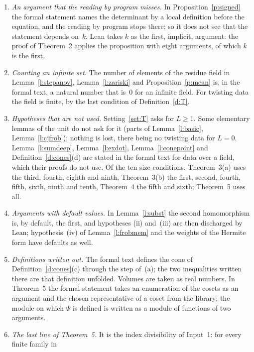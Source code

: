 \documentclass[11pt,a4paper]{article}
\newcommand{\m}[1]{\mbox{$#1$}}        %
\theoremstyle{plainx}
\theoremstyle{uprightx}
\begin{document}
\begin{enumerate}[label=\textup{\arabic*.},leftmargin=1.6em,itemsep=5pt]
the index of the cone of Definition~\ref{d:cones}(d), listed twice. This note states every declaration with the
arguments that its uses in the artifact show: the depth has five, the conditions on forms five and six, the
Frobenius operator five. Lean was not asked.
\item \emph{An argument that the reading by program misses.} In Proposition~\ref{p:signed} the formal statement
names the determinant by a local definition before the equation, and the reading by program stops there; so it
does not see that the statement depends on~$k$. Lean takes $k$ as the first, implicit, argument: the proof of
Theorem~2 applies the proposition with eight arguments, of which $k$ is the first.
\item \emph{Counting an infinite set.} The number of elements of the residue field in
Lemma~\ref{l:stepanov}, Lemma~\ref{l:zariski} and Proposition~\ref{p:mean} is, in the formal text, a natural
number that is~$0$ for an infinite field. For twisting data the field is finite, by the last condition of
Definition~\ref{d:T}.
\item \emph{Hypotheses that are not used.} Setting~\ref{set:T} asks for \m{L\ge1}. Some elementary lemmas of the
unit do not ask for it (parts of Lemma~\ref{l:basic}, Lemma~\ref{l:cjfrob}); nothing is lost, there being no
twisting data for \m{L=0}. Lemma~\ref{l:sumdeep}, Lemma~\ref{l:exdot}, Lemma~\ref{l:conepoint} and
Definition~\ref{d:cones}(d) are stated in the formal text for data over a field, which their proofs do not use.
Of the ten size conditions, Theorem~3(a) uses the third, fourth, eighth and ninth, Theorem~3(b) the first,
second, fourth, fifth, sixth, ninth and tenth, Theorem~4 the fifth and sixth; Theorem~5 uses all.
\item \emph{Arguments with default values.} In Lemma~\ref{l:subst} the second homomorphism is, by default, the
first, and hypotheses (ii) and~(iii) are then discharged by Lean; hypothesis~(iv) of Lemma~\ref{l:frobmem} and the
weights of the Hermite form have defaults as well.
\item \emph{Definitions written out.} The formal text defines the cone of Definition~\ref{d:cones}(c) through
the step of~(a); the two inequalities written there are that definition unfolded. Volumes are taken as real
numbers. In Theorem~5 the formal statement takes an enumeration of the cosets as an argument and the chosen
representative of a coset from the library; the module on which \m{\Psi} is defined is written as a module of
functions of two arguments.
\item \emph{The last line of Theorem~5.} It is the index divisibility of Input~1: for every finite family in

\end{enumerate}
\end{document}
